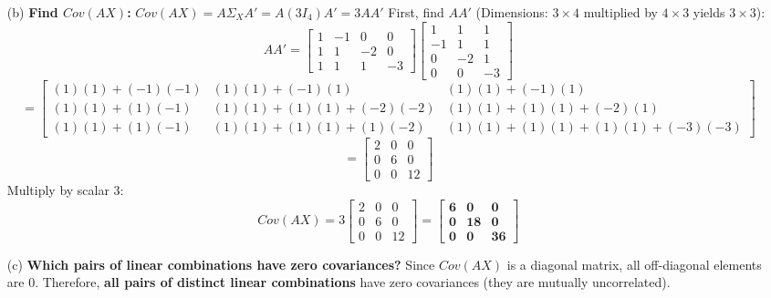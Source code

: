 \documentclass[11pt,letterpaper]{article}
\begin{document}
\begin{enumerate}
    \item[(b)] \textbf{Find $Cov(AX)$:} 
    $Cov(AX) = A \Sigma_X A' = A(3I_4)A' = 3AA'$
    First, find $AA'$ (Dimensions: $3 \times 4$ multiplied by $4 \times 3$ yields $3 \times 3$):
    $$AA' = \begin{bmatrix} 1 & -1 & 0 & 0 \\ 1 & 1 & -2 & 0 \\ 1 & 1 & 1 & -3 \end{bmatrix} \begin{bmatrix} 1 & 1 & 1 \\ -1 & 1 & 1 \\ 0 & -2 & 1 \\ 0 & 0 & -3 \end{bmatrix}$$
    $$= \begin{bmatrix} (1)(1)+(-1)(-1) & (1)(1)+(-1)(1) & (1)(1)+(-1)(1) \\ (1)(1)+(1)(-1) & (1)(1)+(1)(1)+(-2)(-2) & (1)(1)+(1)(1)+(-2)(1) \\ (1)(1)+(1)(-1) & (1)(1)+(1)(1)+(1)(-2) & (1)(1)+(1)(1)+(1)(1)+(-3)(-3) \end{bmatrix}$$
    $$= \begin{bmatrix} 2 & 0 & 0 \\ 0 & 6 & 0 \\ 0 & 0 & 12 \end{bmatrix}$$
    Multiply by scalar 3:
    $$Cov(AX) = 3 \begin{bmatrix} 2 & 0 & 0 \\ 0 & 6 & 0 \\ 0 & 0 & 12 \end{bmatrix} = \mathbf{\begin{bmatrix} 6 & 0 & 0 \\ 0 & 18 & 0 \\ 0 & 0 & 36 \end{bmatrix}}$$
    
    \item[(c)] \textbf{Which pairs of linear combinations have zero covariances?}
    Since $Cov(AX)$ is a diagonal matrix, all off-diagonal elements are 0. Therefore, \textbf{all pairs of distinct linear combinations} have zero covariances (they are mutually uncorrelated).
\end{enumerate}
\end{document}
